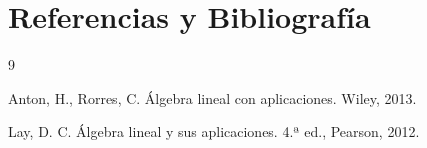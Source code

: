 \documentclass[12pt,a4paper]{article}
\begin{document}
\section{Referencias y Bibliografía}
\renewcommand{\refname}{} %

\begin{thebibliography}{9}
\setlength{\labelwidth}{0pt}
\setlength{\labelsep}{0.15cm}
\setlength{\leftmargin}{0.63cm}
\setlength{\itemindent}{-0.63cm}

Anton, H., Rorres, C. Álgebra lineal con aplicaciones. Wiley, 2013.

Lay, D. C. Álgebra lineal y sus aplicaciones. 4.ª ed., Pearson, 2012.

\end{thebibliography}
\end{document}
